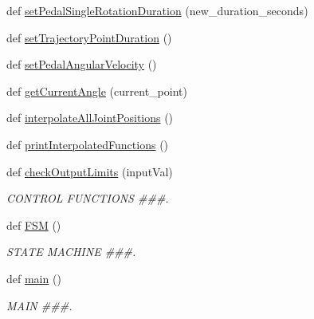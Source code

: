 \begin{DoxyCompactItemize}
\item 
def \mbox{\hyperlink{namespacepedal__simulation__interpolation__cubic__derivative_a4f6620c14991a28592c3f3dbed06d47d}{set\+Pedal\+Single\+Rotation\+Duration}} (new\+\_\+duration\+\_\+seconds)
\item 
def \mbox{\hyperlink{namespacepedal__simulation__interpolation__cubic__derivative_ac9f7dfe56632b8e7d44453f45ce5ed12}{set\+Trajectory\+Point\+Duration}} ()
\item 
def \mbox{\hyperlink{namespacepedal__simulation__interpolation__cubic__derivative_a528056c565ba9114579b889deb90665e}{set\+Pedal\+Angular\+Velocity}} ()
\item 
def \mbox{\hyperlink{namespacepedal__simulation__interpolation__cubic__derivative_ae47142ba2072466092d5ba91b5660336}{get\+Current\+Angle}} (current\+\_\+point)
\item 
def \mbox{\hyperlink{namespacepedal__simulation__interpolation__cubic__derivative_ae85970b5189470f76d1d2b0d709557e4}{interpolate\+All\+Joint\+Positions}} ()
\item 
def \mbox{\hyperlink{namespacepedal__simulation__interpolation__cubic__derivative_a8a5d48b5475d75a026db3db0f5fe8d9e}{print\+Interpolated\+Functions}} ()
\item 
def \mbox{\hyperlink{namespacepedal__simulation__interpolation__cubic__derivative_a3ddde17d9f15cda662ed533aeee486b2}{check\+Output\+Limits}} (input\+Val)
\begin{DoxyCompactList}\small\item\em C\+O\+N\+T\+R\+OL F\+U\+N\+C\+T\+I\+O\+NS \#\#\#. \end{DoxyCompactList}\item 
def \mbox{\hyperlink{namespacepedal__simulation__interpolation__cubic__derivative_a27598c0b1a95f3043035dc3740c4a421}{F\+SM}} ()
\begin{DoxyCompactList}\small\item\em S\+T\+A\+TE M\+A\+C\+H\+I\+NE \#\#\#. \end{DoxyCompactList}\item 
def \mbox{\hyperlink{namespacepedal__simulation__interpolation__cubic__derivative_aec58f843befdd05ee5e003884eb17cba}{main}} ()
\begin{DoxyCompactList}\small\item\em M\+A\+IN \#\#\#. \end{DoxyCompactList}\end{DoxyCompactItemize}
